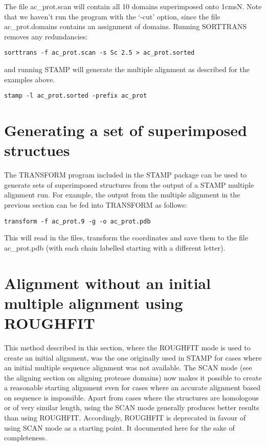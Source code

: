 The file ac\_prot.scan will contain all 10 domains superimposed onto 1cmsN.  Note that
we haven't run the program with the `-cut' option, since the file ac\_prot.domains contains
an assignment of domains. Running SORTTRANS removes any redundancies:

\begin{scriptsize}\begin{verbatim}
sorttrans -f ac_prot.scan -s Sc 2.5 > ac_prot.sorted
\end{verbatim} \end{scriptsize}

and running STAMP will generate the multiple alignment as described for the examples above.

\begin{scriptsize}\begin{verbatim}
stamp -l ac_prot.sorted -prefix ac_prot
\end{verbatim} \end{scriptsize}

\section{Generating a set of superimposed structues}

The TRANSFORM program included in the STAMP package can be used to generate
sets of superimposed structures from the output of a STAMP multiple alignment run.
For example, the output from the multiple alignment in the previous section can
be fed into TRANSFORM as follows:

\begin{scriptsize}\begin{verbatim}
transform -f ac_prot.9 -g -o ac_prot.pdb
\end{verbatim} \end{scriptsize}

This will read in the files, transform the coordinates and save them to
the file ac\_prot.pdb (with each chain labelled starting with a different
letter). 

\section{Alignment without an initial multiple alignment using ROUGHFIT}

This method described in this section, where the ROUGHFIT mode is used to
create an initial alignment, was the one originally used in STAMP for cases where an initial
multiple sequence alignment was not available. The SCAN mode (see the aligning
section on aligning protease domains) now makes it possible to create
a reasonable starting alignment even for cases where an accurate alignment based on sequence 
is impossible. Apart from cases where the structures are homologous or of
very similar length, using the SCAN mode generally produces better results than
using ROUGHFIT. Accordingly, ROUGHFIT is deprecated in favour of using SCAN mode
as a starting point. It documented here for the sake of completeness. 

